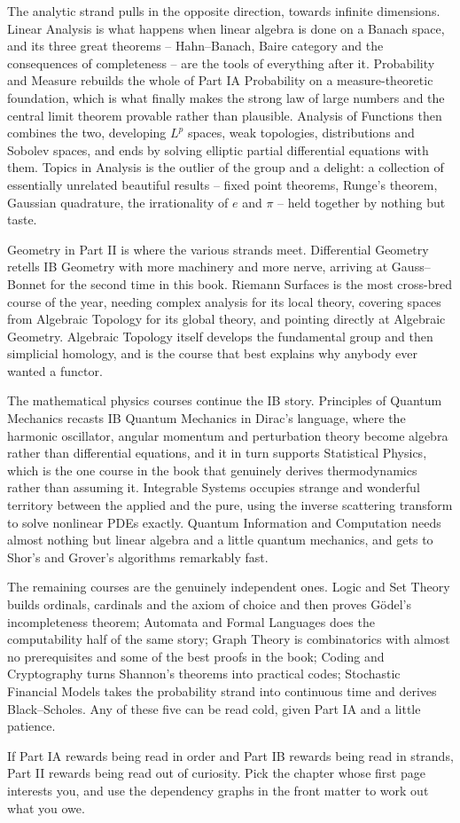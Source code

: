The analytic strand pulls in the opposite direction, towards infinite dimensions.
Linear Analysis is what happens when linear algebra is done on a Banach space, and its
three great theorems -- Hahn--Banach, Baire category and the consequences of
completeness -- are the tools of everything after it. Probability and Measure rebuilds
the whole of Part IA Probability on a measure-theoretic foundation, which is what
finally makes the strong law of large numbers and the central limit theorem provable
rather than plausible. Analysis of Functions then combines the two, developing $L^p$
spaces, weak topologies, distributions and Sobolev spaces, and ends by solving elliptic
partial differential equations with them. Topics in Analysis is the outlier of the
group and a delight: a collection of essentially unrelated beautiful results -- fixed
point theorems, Runge's theorem, Gaussian quadrature, the irrationality of $e$ and
$\pi$ -- held together by nothing but taste.

Geometry in Part II is where the various strands meet. Differential Geometry retells IB
Geometry with more machinery and more nerve, arriving at Gauss--Bonnet for the second
time in this book. Riemann Surfaces is the most cross-bred course of the year, needing
complex analysis for its local theory, covering spaces from Algebraic Topology for its
global theory, and pointing directly at Algebraic Geometry. Algebraic Topology itself
develops the fundamental group and then simplicial homology, and is the course that
best explains why anybody ever wanted a functor.

The mathematical physics courses continue the IB story. Principles of Quantum Mechanics
recasts IB Quantum Mechanics in Dirac's language, where the harmonic oscillator, angular
momentum and perturbation theory become algebra rather than differential equations, and
it in turn supports Statistical Physics, which is the one course in the book that
genuinely derives thermodynamics rather than assuming it. Integrable Systems occupies
strange and wonderful territory between the applied and the pure, using the inverse
scattering transform to solve nonlinear PDEs exactly. Quantum Information and
Computation needs almost nothing but linear algebra and a little quantum mechanics, and
gets to Shor's and Grover's algorithms remarkably fast.

The remaining courses are the genuinely independent ones. Logic and Set Theory builds
ordinals, cardinals and the axiom of choice and then proves G\"odel's incompleteness
theorem; Automata and Formal Languages does the computability half of the same story;
Graph Theory is combinatorics with almost no prerequisites and some of the best proofs
in the book; Coding and Cryptography turns Shannon's theorems into practical codes;
Stochastic Financial Models takes the probability strand into continuous time and
derives Black--Scholes. Any of these five can be read cold, given Part IA and a little
patience.

If Part IA rewards being read in order and Part IB rewards being read in strands, Part
II rewards being read out of curiosity. Pick the chapter whose first page interests
you, and use the dependency graphs in the front matter to work out what you owe.
